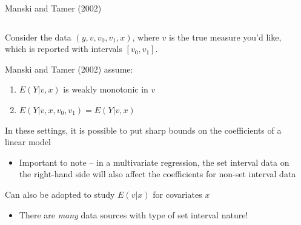 \documentclass[notes,11pt, aspectratio=169]{beamer}
\newenvironment{wideitemize}{\itemize\addtolength{\itemsep}{10pt}}{\enditemize}
\begin{document}
\begin{frame}{Manski and Tamer (2002)}
      \begin{columns}[onlytextwidth, T] %
        \begin{column}{.9\textwidth}
          \begin{wideitemize}
          \item Consider the data $(y, v, v_{0}, v_{1},x)$, where $v$ is
            the true measure you'd like, which is reported with
            intervals $[v_{0},v_{1}]$. 
          \item Manski and Tamer (2002) assume:
            \begin{enumerate}
            \item $E(Y|v,x) $ is weakly monotonic in $v$
            \item $E(Y|v, x,v_{0},v_{1})= E(Y|v,x)$
            \end{enumerate}
          \item In these settings, it is possible to put sharp bounds
            on the coefficients of a linear model
            \begin{itemize}
            \item Important to note -- in a multivariate regression,
              the set interval data on the right-hand side will also
              affect the coefficients for non-set interval data
            \end{itemize}
          \item Can also be adopted to study $E(v | x)$ for covariates $x$
            \begin{itemize}
            \item There are \emph{many} data sources with type of set interval nature!
            \end{itemize}
          \end{wideitemize}
      \end{column}%
      \hfill%
      \begin{column}{.5\textwidth}
      \end{column}%
    \end{columns}
\end{frame}
\end{document}
